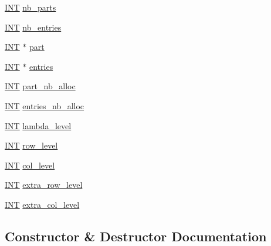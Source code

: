 \begin{DoxyCompactItemize}
\item 
\mbox{\hyperlink{galois_8h_a09fddde158a3a20bd2dcadb609de11dc}{I\+NT}} \mbox{\hyperlink{classgeo__parameter_a8c5615d5c2a13779515a73ad1cf0ab6d}{nb\+\_\+parts}}
\item 
\mbox{\hyperlink{galois_8h_a09fddde158a3a20bd2dcadb609de11dc}{I\+NT}} \mbox{\hyperlink{classgeo__parameter_a42080580bdef7cea6c9dfcfade2726a2}{nb\+\_\+entries}}
\item 
\mbox{\hyperlink{galois_8h_a09fddde158a3a20bd2dcadb609de11dc}{I\+NT}} $\ast$ \mbox{\hyperlink{classgeo__parameter_a1c081d1e30dc9b0a8741d1a5c7642eb0}{part}}
\item 
\mbox{\hyperlink{galois_8h_a09fddde158a3a20bd2dcadb609de11dc}{I\+NT}} $\ast$ \mbox{\hyperlink{classgeo__parameter_af6c320a5873628950f1fcc79d7720c6b}{entries}}
\item 
\mbox{\hyperlink{galois_8h_a09fddde158a3a20bd2dcadb609de11dc}{I\+NT}} \mbox{\hyperlink{classgeo__parameter_ab5191319aa2ab7dbf04492a5f5fdbec2}{part\+\_\+nb\+\_\+alloc}}
\item 
\mbox{\hyperlink{galois_8h_a09fddde158a3a20bd2dcadb609de11dc}{I\+NT}} \mbox{\hyperlink{classgeo__parameter_afd659174894eedac496c936db26690f9}{entries\+\_\+nb\+\_\+alloc}}
\item 
\mbox{\hyperlink{galois_8h_a09fddde158a3a20bd2dcadb609de11dc}{I\+NT}} \mbox{\hyperlink{classgeo__parameter_a2aaae0384cbfdda5e93b70c90b1b24f4}{lambda\+\_\+level}}
\item 
\mbox{\hyperlink{galois_8h_a09fddde158a3a20bd2dcadb609de11dc}{I\+NT}} \mbox{\hyperlink{classgeo__parameter_af83a7d8ca6351c2a72b85e8b7e8a78b2}{row\+\_\+level}}
\item 
\mbox{\hyperlink{galois_8h_a09fddde158a3a20bd2dcadb609de11dc}{I\+NT}} \mbox{\hyperlink{classgeo__parameter_ab9c2763530ddecf8c6f7f56bc381ed45}{col\+\_\+level}}
\item 
\mbox{\hyperlink{galois_8h_a09fddde158a3a20bd2dcadb609de11dc}{I\+NT}} \mbox{\hyperlink{classgeo__parameter_af89cd02cb9fb19afaa06fd9c92d09c89}{extra\+\_\+row\+\_\+level}}
\item 
\mbox{\hyperlink{galois_8h_a09fddde158a3a20bd2dcadb609de11dc}{I\+NT}} \mbox{\hyperlink{classgeo__parameter_a9cc875f3b1bbfabd447d44dbab99630c}{extra\+\_\+col\+\_\+level}}
\end{DoxyCompactItemize}


\subsection{Constructor \& Destructor Documentation}
\mbox{\label{classgeo__parameter_acf01f08b14cf37ae450cec17fb11f1ab}} 
